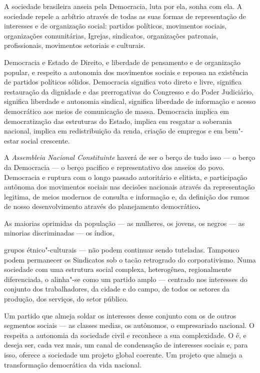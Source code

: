 A sociedade brasileira anseia pela Democracia, luta por ela, sonha com
ela. A sociedade repele a arbítrio através de todas as suas formas de
representação de interesses e de organização social: partidos políticos,
movimentos sociais, organizações comunitárias, Igrejas, sindicatos,
organizações patronais, profissionais, movimentos setoriais e culturais.

Democracia e Estado de Direito, e liberdade de pensamento e de
organização popular, e respeito a autonomia dos movimentos sociais e
repousa na existência de partidos políticos sólidos. Democracia
significa voto direto e livre, significa restauração da dignidade e das
prerrogativas do Congresso e do Poder Judiciário, significa liberdade e
autonomia sindical, significa liberdade de informação e acesso
democrático aos meios de comunicação de massa. Democracia implica em
democratização das estruturas do Estado, implica em resgatar a soberania
nacional, implica em redistribuição da renda, criação de empregos e em
bem"-estar social crescente.

A \emph{Assembleia Nacional Constituinte} haverá de ser o berço de tudo
isso --- o berço da Democracia --- o berço pacifico e representativo dos
anseios do povo. Democracia e ruptura com o longo passado autoritário e
elitista, e participação autônoma dos movimentos sociais nas decisões
nacionais através da representação legitima, de meios modernos de
consulta e informação e, da definição dos rumos de nosso desenvolvimento
através do planejamento democrático\textbf{. }

As maiorias oprimidas da população --- as mulheres, os jovens, os negros
--- as minorias discriminadas --- os índios,

grupos étnico"-culturais --- não podem continuar sendo tuteladas.
Tampouco podem permanecer os Sindicatos sob o tacão retrogrado do
corporativismo. Numa sociedade com uma estrutura social complexa,
heterogênea, regionalmente diferenciada, o  alinha"-se como um
partido amplo --- centrado nos interesses do conjunto dos trabalhadores,
da cidade e do campo, de todos os setores da produção, dos serviços, do
setor público.

Um partido que almeja soldar os interesses desse conjunto com os de
outros segmentos sociais --- as classes medias, os autônomos, o
empresariado nacional. O  respeita a autonomia da sociedade civil e
reconhece a sua complexidade. O  é, e deseja ser, cada vez mais, um
canal de condensação de interesses sociais e, para isso, oferece a
sociedade um projeto global coerente. Um projeto que almeja a
transformação democrática da vida nacional.

